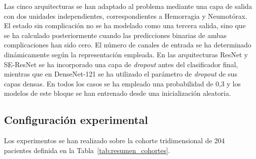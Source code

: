 

Las cinco arquitecturas se han adaptado al problema mediante una capa de salida con dos unidades independientes, correspondientes a Hemorragia y Neumotórax. El estado sin complicación no se ha modelado como una tercera salida, sino que se ha calculado posteriormente cuando las predicciones binarias de ambas complicaciones han sido cero. El número de canales de entrada se ha determinado dinámicamente según la representación empleada. En las arquitecturas ResNet y SE-ResNet se ha incorporado una capa de \textit{dropout} antes del clasificador final, mientras que en DenseNet-121 se ha utilizado el parámetro de \textit{dropout} de sus capas densas. En todos los casos se ha empleado una probabilidad de 0,3 y los modelos de este bloque se han entrenado desde una inicialización aleatoria.



\subsection{Configuración experimental}

Los experimentos se han realizado sobre la cohorte tridimensional de 204 pacientes definida en la Tabla~\ref{tab:resumen_cohortes}.

